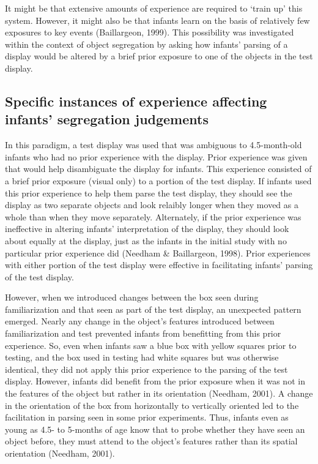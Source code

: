 It might be that extensive amounts of experience are required to
`train up' this system.  However, it might also be that infants learn
on the basis of relatively few exposures to key events (Baillargeon,
1999).  This possibility was investigated within the context of object
segregation by asking how infants' parsing of a display would be
altered by a brief prior exposure to one of the objects in the test
display.



\subsection{Specific instances of experience affecting infants' segregation judgements}

In this paradigm, a test display was used that was ambiguous to
4.5-month-old infants who had no prior experience with the display.
Prior experience was given that would help disambiguate the display
for infants.  This experience consisted of a brief prior exposure
(visual only) to a portion of the test display.  If infants used this
prior experience to help them parse the test display, they should see
the display as two separate objects and look relaibly longer when they
moved as a whole than when they move separately.  Alternately, if the
prior experience was ineffective in altering infants'
interpretation of the display, they should look about equally at the
display, just as the infants in the initial study with no particular
prior experience did (Needham \& Baillargeon, 1998).  Prior experiences
with either portion of the test display were effective in facilitating
infants' parsing of the test display.  

However, when we introduced changes between the box seen during
familiarization and that seen as part of the test display, an
unexpected pattern emerged.  Nearly any change in the object's
features introduced between familiarization and test prevented infants
from benefitting from this prior experience.  So, even when infants
saw a blue box with yellow squares prior to testing, and the box used
in testing had white squares but was otherwise identical, they did not
apply this prior experience to the parsing of the test display.
However, infants did benefit from the prior exposure when it was not
in the features of the object but rather in its orientation (Needham,
2001).  A change in the orientation of the box from horizontally to
vertically oriented led to the facilitation in parsing seen in some
prior experiments.  Thus, infants even as young as 4.5- to 5-months of
age know that to probe whether they have seen an object before, they
must attend to the object's features rather than its spatial
orientation (Needham, 2001).

